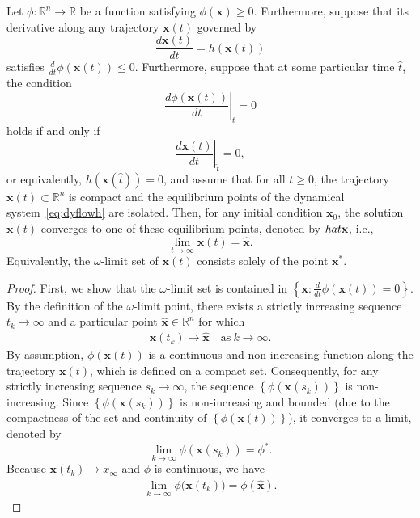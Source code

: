 \documentclass[onefignum,onetabnum]{siamart220329}
\begin{document}
    
    {\color{blue}
    \begin{lemma}\label{thm:mainasymp}
    Let $\phi:\mathbb{R}^n \to \mathbb{R}$ be a function satisfying $\phi(\mathbf{x}) \geq 0$. Furthermore, suppose that its derivative along any trajectory $\mathbf{x}(t)$ governed by
    \begin{equation}\label{eq:dyflowh} \frac{d\mathbf{x}(t)}{dt} = h(\mathbf{x}(t)) \end{equation}
    satisfies $\frac{d}{dt} \phi(\mathbf{x}(t)) \leq 0$. 
    Furthermore, suppose that at some particular time $\hat{t}$, the condition  
    \[
    \left.\frac{d\phi(\mathbf{x}(t))}{dt}\right|_{\hat{t}} = 0
    \]  
    holds if and only if  
    \[
    \left.\frac{d\mathbf{x}(t)}{dt}\right|_{\hat{t}} = 0,
    \]  
    or equivalently, $h(\mathbf{x}(\hat{t})) = 0$, and assume that for all $t \geq 0$, the trajectory $\mathbf{x}(t) \subset \mathbb{R}^n$ is compact and the equilibrium points of the dynamical system~\eqref{eq:dyflowh} are isolated.
     Then, for any initial condition $\mathbf{x}_0$, the solution $\mathbf{x}(t)$ converges to one of these equilibrium points, denoted by $\\hat{\mathbf{x}}$, i.e., 
    \begin{equation}
        \lim_{t \to \infty} \mathbf{x}(t) = \hat{\mathbf{x}}.
    \end{equation}
    Equivalently, the $\omega$-limit set of $\mathbf{x}(t)$ consists solely of the point $\mathbf{x}^*$.  
    \end{lemma}
    
    \begin{proof}
     
    First, we show that the $\omega$-limit set is contained in $\left\{\mathbf{x}: 
    \frac{d}{dt} \phi(\mathbf{x}(t))
    = 0\right\}$. By the definition of the $\omega$-limit point, there exists a strictly increasing sequence $t_k \to \infty$ and a particular point $\hat{\mathbf{x}}\in\mathbb{R}^{n}$ for which
    \begin{eqnarray*}
        \mathbf{x}(t_k) \to \hat{\mathbf{x}} \quad \text{as}\ k \to \infty.
    \end{eqnarray*}
    By assumption, $\phi(\mathbf{x}(t))$ is a continuous and non-increasing function along the trajectory $\mathbf{x}(t)$, which is  defined on a compact set. Consequently, for any strictly increasing sequence $s_k \to \infty$, the sequence $\left\{\phi(\mathbf{x}(s_k))\right\}$ is non-increasing. Since $\left\{\phi(\mathbf{x}(s_k))\right\}$ is non-increasing and bounded (due to the compactness of the set and continuity of $\left\{\phi(\mathbf{x}(t))\right\}$), it converges to a limit, denoted by
    \begin{equation*}
        \lim_{k \to \infty} \phi(\mathbf{x}(s_k)) = \phi^*.
    \end{equation*}
    Because $\mathbf{x}(t_k) \to x_\infty$ and $\phi$ is continuous, we have
    \begin{eqnarray*}
        \lim_{k \to \infty} \phi\bigl(\mathbf{x}(t_k)\bigr) = \phi(\hat{\mathbf{x}}).
    \end{eqnarray*}
    

\end{proof}}
\end{document}
